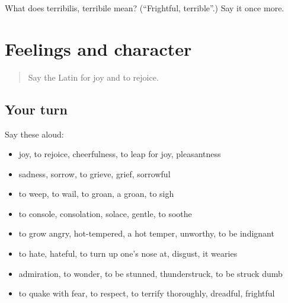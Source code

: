 \begin{tcolorbox}[breakable,colback=teal!4,colframe=teal!35!black,title={Before you move on}]
What does terribilis, terribile mean? (\textquotedblleft{}Frightful, terrible\textquotedblright{}.) Say it once more.
\end{tcolorbox}
\section[(dialogue)]{Feelings and character}

\label{lesson:LA-R496-review-489-496}



\begin{quote}
Say the Latin for joy and to rejoice.
\end{quote}

\subsection*{Your turn}
Say these aloud:

\begin{itemize}
\raggedright
  \item joy, to rejoice, cheerfulness, to leap for joy, pleasantness
  \item sadness, sorrow, to grieve, grief, sorrowful
  \item to weep, to wail, to groan, a groan, to sigh
  \item to console, consolation, solace, gentle, to soothe
  \item to grow angry, hot-tempered, a hot temper, unworthy, to be indignant
  \item to hate, hateful, to turn up one's nose at, disgust, it wearies
  \item admiration, to wonder, to be stunned, thunderstruck, to be struck dumb
  \item to quake with fear, to respect, to terrify thoroughly, dreadful, frightful
\end{itemize}

